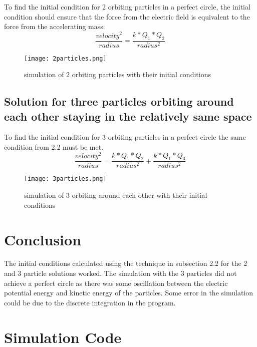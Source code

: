 \documentclass[a4paper]{article}
\begin{document}
To find the initial condition for 2 orbiting particles in a perfect circle, the initial condition should ensure that the force from the electric field is equivalent to the force from the accelerating mass: \[\frac{velocity^2}{radius} = \frac{k*Q_1*Q_2}{radius^2}\] 

\begin{figure}
\centering
\texttt{[image: 2particles.png]}
\caption{\label{fig:two orbiting particles} simulation of 2 orbiting particles with their initial conditions}
\end{figure}


\subsection{Solution for three particles orbiting around each other staying in the relatively same space}

To find the initial condition for 3 orbiting particles in a perfect circle the same condition from 2.2 must be met. 
\[\frac{velocity^2}{radius} = \frac{k*Q_1*Q_2}{radius^2}+ \frac{k*Q_1*Q_3}{radius^2}\] 


\begin{figure}
\centering
\texttt{[image: 3particles.png]}
\caption{\label{fig:three orbiting particles} simulation of 3 orbiting around each other with their initial conditions}
\end{figure}

\section{Conclusion}

The initial conditions calculated using the technique in subsection 2.2 for the 2 and 3 particle solutions worked. The simulation with the 3 particles did not achieve a perfect circle as there was some oscillation between the electric potential energy and kinetic energy of the particles. Some error in the simulation could be due to the discrete integration in the program.


\section{Simulation Code}
\end{document}
